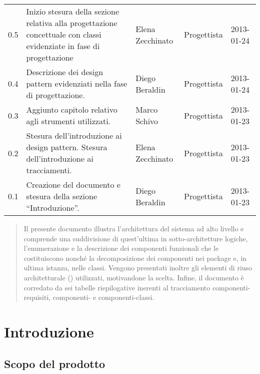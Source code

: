 \begin{center}
\begin{longtable}{lp{}lll}
0.5 & Inizio stesura della sezione relativa alla progettazione concettuale con classi evidenziate in fase di progettazione &Elena Zecchinato& Progettista & 2013-01-24\\
0.4 & Descrizione dei design pattern evidenziati nella fase di progettazione. &Diego Beraldin & Progettista & 2013-01-24\\
0.3 & Aggiunto capitolo relativo agli strumenti utilizzati.& Marco Schivo & Progettista & 2013-01-23\\
0.2 & Stesura dell'introduzione ai design pattern. Stesura dell'introduzione ai tracciamenti. &Elena Zecchinato & Progettista & 2013-01-23\\
0.1 & Creazione del documento e stesura della sezione ``Introduzione''. &Diego Beraldin & Progettista & 2013-01-23\\
\bottomrule
\end{longtable}
\end{center}
\clearpage



\setcounter{page}{1}
\pagestyle{normal}

\clearpage

\begin{abstract}
Il presente documento illustra l'architettura del sistema ad alto livello e comprende una suddivisione di quest'ultima in sotto-architetture logiche, l'enumerazione e la descrizione dei componenti funzionali che le costituiscono nonché la decomposizione dei componenti nei package e, in ultima istanza, nelle classi. Vengono presentati inoltre gli elementi di riuso architetturale () utilizzati, motivandone la scelta. Infine, il documento è corredato da sei tabelle riepilogative inerenti al tracciamento componenti-requisiti, componenti-\underline{} e componenti-classi.
\end{abstract}
\clearpage

\section{Introduzione}
\subsection{Scopo del prodotto}
\purpose


